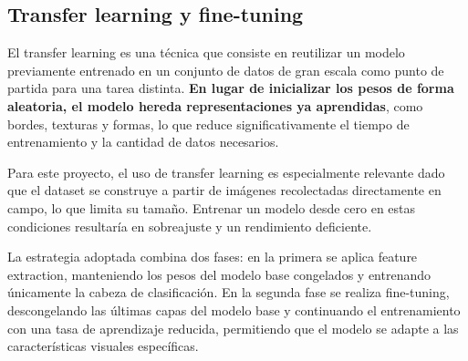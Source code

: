\subsection{Transfer learning y fine-tuning}

El transfer learning es una técnica que consiste en reutilizar un modelo previamente entrenado en un conjunto de datos de gran escala como punto de partida para una tarea distinta. \textbf{En lugar de inicializar los pesos de forma aleatoria, el modelo hereda representaciones ya aprendidas}, como bordes, texturas y formas, lo que reduce significativamente el tiempo de entrenamiento y la cantidad de datos necesarios.

Para este proyecto, el uso de transfer learning es especialmente relevante dado que el dataset se construye a partir de imágenes recolectadas directamente en campo, lo que limita su tamaño. Entrenar un modelo desde cero en estas condiciones resultaría en sobreajuste y un rendimiento deficiente.

La estrategia adoptada combina dos fases: en la primera se aplica feature extraction, manteniendo los pesos del modelo base congelados y entrenando únicamente la cabeza de clasificación. En la segunda fase se realiza fine-tuning, descongelando las últimas capas del modelo base y continuando el entrenamiento con una tasa de aprendizaje reducida, permitiendo que el modelo se adapte a las características visuales específicas.